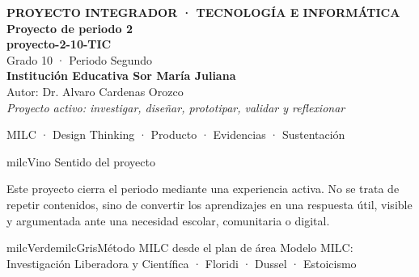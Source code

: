 \documentclass[11pt,letterpaper]{article}
\begin{document}
\thispagestyle{empty}

\vspace*{.85cm}
\begin{tcolorbox}[
  enhanced,colback=milcVino,colframe=milcVino,arc=12mm,width=.86\textwidth,
  boxrule=0pt,left=12mm,right=12mm,top=11mm,bottom=11mm,center,
  overlay={\draw[milcMagenta,line width=2pt,dash pattern=on 9pt off 8pt,rounded corners=10mm]
  ([xshift=7mm,yshift=-7mm]frame.north west) rectangle ([xshift=-7mm,yshift=7mm]frame.south east);}]
  \centering
  {\sffamily\bfseries\color{white}\fontsize{15}{17}\selectfont PROYECTO INTEGRADOR · TECNOLOGÍA E INFORMÁTICA}\\[1.0cm]
  {\sffamily\bfseries\color{white}\fontsize{30}{33}\selectfont Proyecto de periodo 2}\\[3mm]
  {\sffamily\bfseries\color{milcMostaza}\fontsize{25}{28}\selectfont proyecto-2-10-TIC}\\[8mm]
  {\sffamily\color{white}\Large Grado 10 · Periodo Segundo}\\[1.0cm]
  {\sffamily\bfseries\color{white}\large Institución Educativa Sor María Juliana}\\[2mm]
  {\sffamily\color{white}Autor: Dr. Alvaro Cardenas Orozco}\\[4mm]
  {\sffamily\itshape\color{white}Proyecto activo: investigar, diseñar, prototipar, validar y reflexionar}
\end{tcolorbox}
\vfill
\begin{tcolorbox}[enhanced,colback=milcVino!72!black,colframe=milcVino!72!black,arc=5mm,boxrule=0pt,width=.86\textwidth,left=6mm,right=6mm,top=4mm,bottom=4mm,center]
{\color{white}\sffamily\small MILC · Design Thinking · Producto · Evidencias · Sustentación}
\end{tcolorbox}

\newpage
\begin{titlebox}{milcVino}
Sentido del proyecto
\end{titlebox}
\begin{multicols}{2}
Este proyecto cierra el periodo mediante una experiencia activa. No se trata de repetir contenidos, sino de convertir los aprendizajes en una respuesta útil, visible y argumentada ante una necesidad escolar, comunitaria o digital.

\columnbreak
\begin{softbox}{milcVerde}{milcGris}{Método MILC desde el plan de área}
Modelo MILC: Investigación Liberadora y Científica · Floridi · Dussel · Estoicismo
\end{softbox}
\end{multicols}
\end{document}
